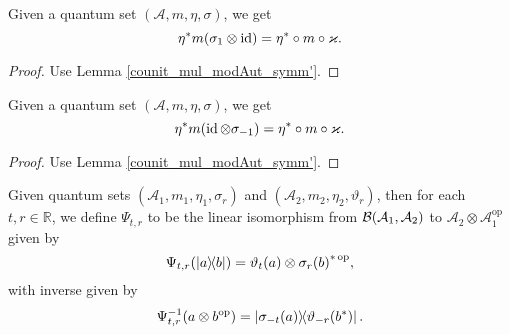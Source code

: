  \begin{corollary}\label{moving_twists}
  \leanok
  Given a quantum set $(\mathcal{A},m,\eta,\sigma)$, we get
  \[\eta^* m(\sigma_{1}\otimes\operatorname{id})=\eta^*\circ m\circ\varkappa.\]
 \end{corollary}
 \begin{proof}\leanok
  Use Lemma \ref{counit_mul_modAut_symm'}.
 \end{proof}
 \begin{corollary}\label{moving_twists_2}
  \leanok
  Given a quantum set $(\mathcal{A},m,\eta,\sigma)$, we get
  \[\eta^* m(\operatorname{id}\otimes\sigma_{-1})=\eta^*\circ m\circ\varkappa.\]
 \end{corollary}
 \begin{proof}\leanok
  Use Lemma \ref{counit_mul_modAut_symm'}.
 \end{proof}
 
 \begin{definition}\label{QuantumSet.Psi}
  \leanok
  Given quantum sets $(\mathcal{A}_1,m_1,\eta_1,\sigma_r)$ and $(\mathcal{A}_2,m_2,\eta_2,\vartheta_r)$, then for each $t,r\in\mathbb{R}$, we define $\Psi_{t,r}$ to be the linear isomorphism from $\mathcal{B}(\mathcal{A}_1,\mathcal{A}_2)$ to $\mathcal{A}_2\otimes\mathcal{A}_1^{\operatorname{op}}$ given by
  \[\Psi_{t,r}(\left\lvert a\right\rangle\!\!\left\langle b\right\rvert)=\vartheta_t(a)\otimes{\sigma_r(b)}^{*\operatorname{op}},\]
  with inverse given by
  \[\Psi_{t,r}^{-1}(a\otimes b^{\operatorname{op}})=\left\lvert\sigma_{-t}(a)\right\rangle\!\!\left\langle\vartheta_{-r}(b^*)\right\rvert.\]
 \end{definition}